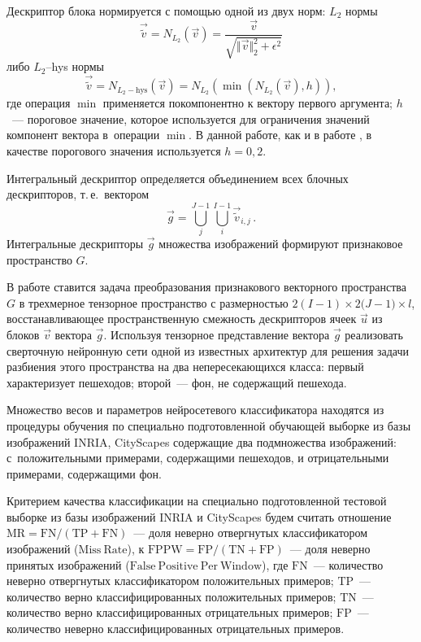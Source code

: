 \documentclass[12pt,twoside]{article}
\begin{document}
	 Дескриптор блока нормируется с помощью одной из двух норм:
		 $L_2$ нормы
\begin{equation*}
	\vec{\tilde{v}} = N_{L_{2}}(\vec{v}) =  \frac{\vec{v}}{\sqrt{\Vert \vec{v} \Vert_{2}^{2} + \epsilon^{2}}}
	\label{eq:L2}
\end{equation*}
либо $L_2$--hys нормы \cite{dalaltriggs2005}
\begin{equation*}
	\vec{\tilde{v}} = N_{L_{2}-\mathrm{hys}}(\vec{v}) =  N_{L_{2}}
	\left(\min(N_{L_{2}}(\vec{v}),h)\right),
	\label{eq:L2-hys}
\end{equation*}
где операция $\min$ применяется покомпонентно к вектору первого
аргумента; $h$~--- пороговое значение, которое используется для
ограничения значений компонент вектора в~операции $\min$. В данной работе, как и в работе \cite{dalaltriggs2005}, в качестве порогового значения используется $h=0{,}2$.


Интегральный дескриптор определяется объединением всех
блочных дескрипторов, т.\,е.\ вектором
\begin{equation}
\vec {g}=\bigcup_j^{J-1}{\bigcup_i^{I-1}{\vec{\tilde{v}}_{i,j}}}\,.
\end{equation}
Интегральные дескрипторы $\vec{g}$ множества изображений формируют
признаковое пространство $G$. 

В работе ставится задача преобразования признакового векторного пространства $G$ в трехмерное тензорное пространство с размерностью ${2(I-1)}\times{2(J-1})\times{l}$, восстанавливающее пространственную смежность дескрипторов ячеек $\vec{u}$ из блоков $\vec{v}$ вектора $\vec{g}$. Используя тензорное представление вектора $\vec{g}$ реализовать сверточную нейронную сети одной из известных архитектур для решения задачи разбиения этого пространства
на два непересекающихся класса: первый характеризует пешеходов; второй~--- фон, не содержащий пешехода. 

Множество весов и параметров нейросетевого классификатора находятся из процедуры обучения по специально подготовленной 
обучающей выборке из базы изображений INRIA, CityScapes \cite{inria} содержащие два подмножества изображений: 
с~положительными примерами, содержащими пешеходов, и отрицательными примерами, содержащими фон.

	Критерием качества классификации  на специально
	подготовленной тестовой выборке из базы изображений INRIA \cite{inria} и CityScapes
	будем считать отношение $\mathrm{MR} = \mathrm{FN}/(\mathrm{TP}+\mathrm{FN})$~---
	доля неверно отвергнутых классификатором изображений ($\mathrm{Miss\ Rate}$),
	к $\mathrm{FPPW} = \mathrm{FP}/(\mathrm{TN}+\mathrm{FP})$~---
	доля неверно принятых изображений ($\mathrm{False\ Positive\ Per\
	Window}$), где $\mathrm{FN}$~--- количество неверно отвергнутых
	классификатором положительных примеров; $\mathrm{TP}$~---
	количество верно классифицированных положительных примеров;
	$\mathrm{TN}$~--- количество верно классифицированных отрицательных
	примеров; $\mathrm{FP}$~--- количество неверно классифицированных отрицательных примеров.
\end{document}
